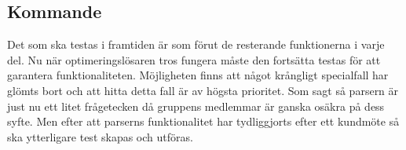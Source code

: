 \subsection{Kommande}
Det som ska testas i framtiden är som förut de resterande funktionerna i varje del. Nu när optimeringslösaren tros fungera måste den fortsätta testas för att garantera funktionaliteten. Möjligheten finns att något krångligt specialfall har glömts bort och att hitta detta fall är av högsta prioritet. \newline
Som sagt så parsern är just nu ett litet frågetecken då gruppens medlemmar är ganska osäkra på dess syfte. Men efter att parserns funktionalitet har tydliggjorts efter ett kundmöte så ska ytterligare test skapas och utföras.